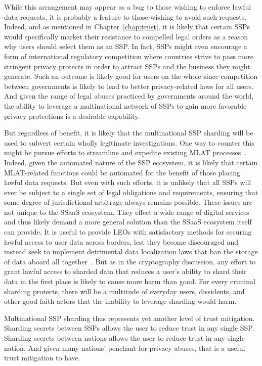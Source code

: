 While this arrangement may appear as a bug to those wishing to enforce
lawful data requests, it is probably a feature to those wishing to
avoid such requests. Indeed, and as mentioned in
Chapter~\ref{chap:trust}, it is likely that certain SSPs would
specifically market their resistance to compelled legal orders as a
reason why users should select them as an SSP. In fact, SSPs might
even encourage a form of international regulatory competition where
countries strive to pass more stringent privacy protects in order to
attract SSPs and the business they might generate. Such an outcome is
likely good for users on the whole since competition between
governments is likely to lead to better privacy-related laws for all
users. And given the range of legal abuses practiced by governments
around the world, the ability to leverage a multinational network of
SSPs to gain more favorable privacy protections is a desirable
capability.

But regardless of benefit, it is likely that the multinational SSP
sharding will be used to subvert certain wholly legitimate
investigations. One way to counter this might be pursue efforts to
streamline and expedite existing MLAT
processes~\cite{nojeim2015}. Indeed, given the automated nature of the
SSP ecosystem, it is likely that certain MLAT-related functions could
be automated for the benefit of those placing lawful data
requests. But even with such efforts, it is unlikely that all SSPs
will ever be subject to a single set of legal obligations and
requirements, ensuring that some degree of jurisdictional arbitrage
always remains possible. These issues are not unique to the SSaaS
ecosystem. They effect a wide range of digital services and thus
likely demand a more general solution than the SSaaS ecosystem itself
can provide. It is useful to provide LEOs with satisfactory methods
for securing lawful access to user data across borders, lest they
become discouraged and instead seek to implement detrimental data
localization laws that ban the storage of data aboard all
together~\cite{whitehouse2013}. But as in the cryptography discussion,
any effort to grant lawful access to sharded data that reduces a
user's ability to shard their data in the first place is likely to
cause more harm than good. For every criminal sharding protects, there
will be a multitude of everyday users, dissidents, and other good
faith actors that the inability to leverage sharding would harm.

Multinational SSP sharding thus represents yet another level of trust
mitigation. Sharding secrets between SSPs allows the user to reduce
trust in any single SSP. Sharding secrets between nations allows the
user to reduce trust in any single nation. And given many nations'
penchant for privacy abuses, that is a useful trust mitigation to
have.

